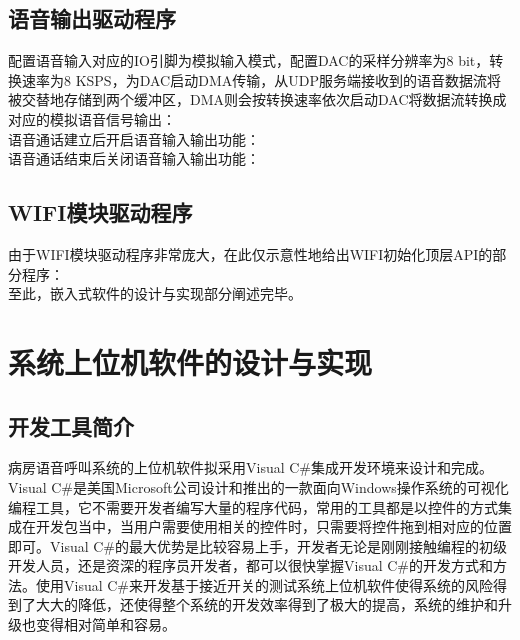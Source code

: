 \subsection{语音输出驱动程序}
配置语音输入对应的IO引脚为模拟输入模式，配置\acrshort{DAC}的采样分辨率为8 bit，转换速率为8 KSPS，为\acrshort{DAC}启动\acrshort{DMA}传输，从UDP服务端接收到的语音数据流将被交替地存储到两个缓冲区，\acrshort{DMA}则会按转换速率依次启动\acrshort{DAC}将数据流转换成对应的模拟语音信号输出：\\


语音通话建立后开启语音输入输出功能：\\


语音通话结束后关闭语音输入输出功能：\\


\subsection{WIFI模块驱动程序}
由于WIFI模块驱动程序非常庞大，在此仅示意性地给出WIFI初始化顶层API的部分程序：\\


至此，嵌入式软件的设计与实现部分阐述完毕。

\section{系统上位机软件的设计与实现}
\subsection{开发工具简介}
病房语音呼叫系统的上位机软件拟采用Visual C{\#}集成开发环境来设计和完成。Visual C{\#}是美国Microsoft公司设计和推出的一款面向Windows操作系统的可视化编程工具，它不需要开发者编写大量的程序代码，常用的工具都是以控件的方式集成在开发包当中，当用户需要使用相关的控件时，只需要将控件拖到相对应的位置即可。Visual C{\#}的最大优势是比较容易上手，开发者无论是刚刚接触编程的初级开发人员，还是资深的程序员开发者，都可以很快掌握Visual C{\#}的开发方式和方法。使用Visual C{\#}来开发基于接近开关的测试系统上位机软件使得系统的风险得到了大大的降低，还使得整个系统的开发效率得到了极大的提高，系统的维护和升级也变得相对简单和容易。

